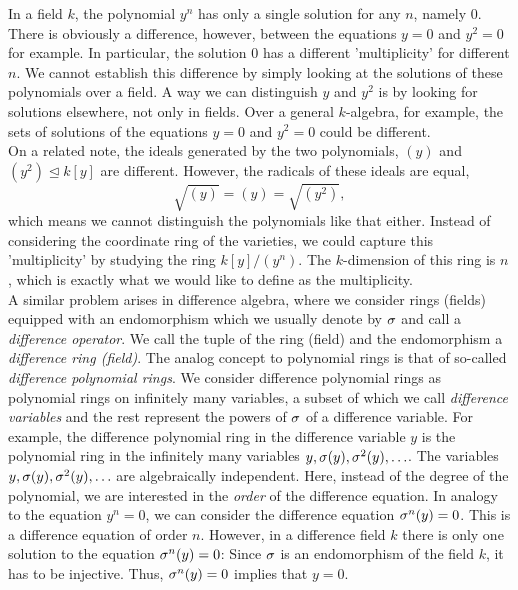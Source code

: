 In a field $k$, the polynomial $y^n$ has only a single solution for any $n$, namely $0$. 
There is obviously a difference, however, between the equations $y = 0$ and $y^2 = 0$ for example. In particular, the solution $0$ has a different 'multiplicity' for different $n$.
We cannot establish this difference by simply looking at the solutions of these polynomials over a field.
  A way we can distinguish $y$ and $y^2$ is by looking for solutions elsewhere, not only in fields.
Over a general $k$-algebra, for example, the sets of solutions of the equations $y = 0$ and $y^2 = 0$ could be different. \\


On a related note, the ideals generated by the two polynomials, $(y)$ and $(y^2) \unlhd k[y]$ are different. However, the radicals of these ideals are equal,
$$ \sqrt{ (y) } = (y) = \sqrt{(y^2)}, $$ which means we cannot distinguish the polynomials like that either.
Instead of considering the coordinate ring of the varieties, we could capture this 'multiplicity' by studying the ring $k[y]/(y^n)$.
The $k$-dimension of this ring is $n$, which is exactly what we would like to define as the multiplicity. \\

A similar problem arises in difference algebra, where we consider rings (fields) equipped with an endomorphism which we usually denote by $\sigma$ and call a \emph{difference operator}. We call the tuple of the ring (field) and the endomorphism a \emph{difference ring (field)}.
The analog concept to polynomial rings is that of so-called \emph{difference polynomial rings}. We consider difference polynomial rings as polynomial rings on infinitely many variables, a subset of which we call \emph{difference variables} and the rest represent the powers of $\sigma$ of a difference variable. 
For example, the difference polynomial ring in the difference variable $y$ is the polynomial ring in the infinitely many variables $y, \sigma(y), \sigma^2(y),\ldots$.
The variables $y, \sigma(y), \sigma^2(y), \ldots$ are algebraically independent.
Here, instead of the degree of the polynomial, we are interested in the \emph{order} of the difference equation.
In analogy to the equation $y^n = 0$, we can consider the difference equation $\sigma^n(y) = 0$. This is a difference equation of order $n$.
However, in a difference field $k$ there is only one solution to the equation $\sigma^n(y) = 0$: Since $\sigma$ is an endomorphism of the field $k$,
it has to be injective. Thus, $\sigma^n(y) = 0$ implies that $y = 0$. \\

